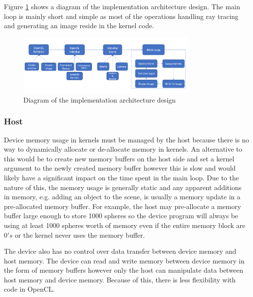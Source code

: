 \documentclass[final]{cmpreport}
\begin{document}
Figure \ref{arch_design} shows a diagram of the implementation architecture design. The main loop is mainly short and simple as most of the operations handling ray tracing and generating an image reside in the kernel code.

\begin{figure}
    \centering
    \includegraphics[width=0.8\textwidth]{img/architecture_diagram.png}
    \caption{Diagram of the implementation architecture design}
    \label{arch_design}
\end{figure}

\subsubsection{Host}

Device memory usage in kernels must be managed by the host because there is no way to dynamically allocate or de-allocate memory in kernels. An alternative to this would be to create new memory buffers on the host side and set a kernel argument to the newly created memory buffer however this is slow and would likely have a significant impact on the time spent in the main loop. Due to the nature of this, the memory usage is generally static and any apparent additions in memory, e.g. adding an object to the scene, is usually a memory update in a pre-allocated memory buffer. For example, the host may pre-allocate a memory buffer large enough to store 1000 spheres so the device program will always be using at least 1000 spheres worth of memory even if the entire memory block are $0's$ or the kernel never uses the memory buffer.

The device also has no control over data transfer between device memory and host memory. The device can read and write memory between device memory in the form of memory buffers however only the host can manipulate data between host memory and device memory. Because of this, there is less flexibility with code in OpenCL.
\end{document}
